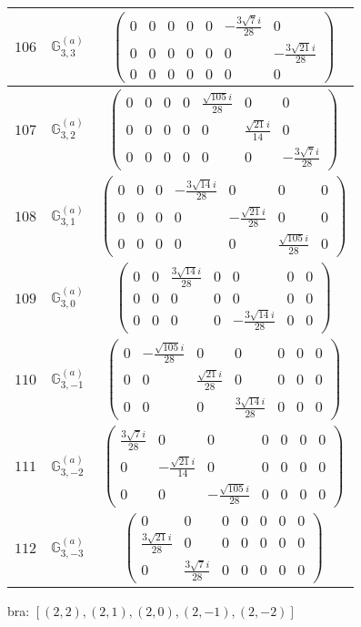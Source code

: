 \documentclass[fleqn,8pt,landscape]{jsarticle}
\begin{document}
\begin{center}
\begin{longtable}{ccc}
$ 106 $ & $ \mathbb{G}_{3,3}^{(a)} $ & $ \begin{pmatrix} 0 & 0 & 0 & 0 & 0 & - \frac{3 \sqrt{7} i}{28} & 0 \\ 0 & 0 & 0 & 0 & 0 & 0 & - \frac{3 \sqrt{21} i}{28} \\ 0 & 0 & 0 & 0 & 0 & 0 & 0 \end{pmatrix} $ \\ \hline
$ 107 $ & $ \mathbb{G}_{3,2}^{(a)} $ & $ \begin{pmatrix} 0 & 0 & 0 & 0 & \frac{\sqrt{105} i}{28} & 0 & 0 \\ 0 & 0 & 0 & 0 & 0 & \frac{\sqrt{21} i}{14} & 0 \\ 0 & 0 & 0 & 0 & 0 & 0 & - \frac{3 \sqrt{7} i}{28} \end{pmatrix} $ \\ \hline
$ 108 $ & $ \mathbb{G}_{3,1}^{(a)} $ & $ \begin{pmatrix} 0 & 0 & 0 & - \frac{3 \sqrt{14} i}{28} & 0 & 0 & 0 \\ 0 & 0 & 0 & 0 & - \frac{\sqrt{21} i}{28} & 0 & 0 \\ 0 & 0 & 0 & 0 & 0 & \frac{\sqrt{105} i}{28} & 0 \end{pmatrix} $ \\ \hline
$ 109 $ & $ \mathbb{G}_{3,0}^{(a)} $ & $ \begin{pmatrix} 0 & 0 & \frac{3 \sqrt{14} i}{28} & 0 & 0 & 0 & 0 \\ 0 & 0 & 0 & 0 & 0 & 0 & 0 \\ 0 & 0 & 0 & 0 & - \frac{3 \sqrt{14} i}{28} & 0 & 0 \end{pmatrix} $ \\ \hline
$ 110 $ & $ \mathbb{G}_{3,-1}^{(a)} $ & $ \begin{pmatrix} 0 & - \frac{\sqrt{105} i}{28} & 0 & 0 & 0 & 0 & 0 \\ 0 & 0 & \frac{\sqrt{21} i}{28} & 0 & 0 & 0 & 0 \\ 0 & 0 & 0 & \frac{3 \sqrt{14} i}{28} & 0 & 0 & 0 \end{pmatrix} $ \\ \hline
$ 111 $ & $ \mathbb{G}_{3,-2}^{(a)} $ & $ \begin{pmatrix} \frac{3 \sqrt{7} i}{28} & 0 & 0 & 0 & 0 & 0 & 0 \\ 0 & - \frac{\sqrt{21} i}{14} & 0 & 0 & 0 & 0 & 0 \\ 0 & 0 & - \frac{\sqrt{105} i}{28} & 0 & 0 & 0 & 0 \end{pmatrix} $ \\ \hline
$ 112 $ & $ \mathbb{G}_{3,-3}^{(a)} $ & $ \begin{pmatrix} 0 & 0 & 0 & 0 & 0 & 0 & 0 \\ \frac{3 \sqrt{21} i}{28} & 0 & 0 & 0 & 0 & 0 & 0 \\ 0 & \frac{3 \sqrt{7} i}{28} & 0 & 0 & 0 & 0 & 0 \end{pmatrix} $ \\
\end{longtable}
\end{center}
bra: $[(2,2),(2,1),(2,0),(2,-1),(2,-2)]$
\end{document}

